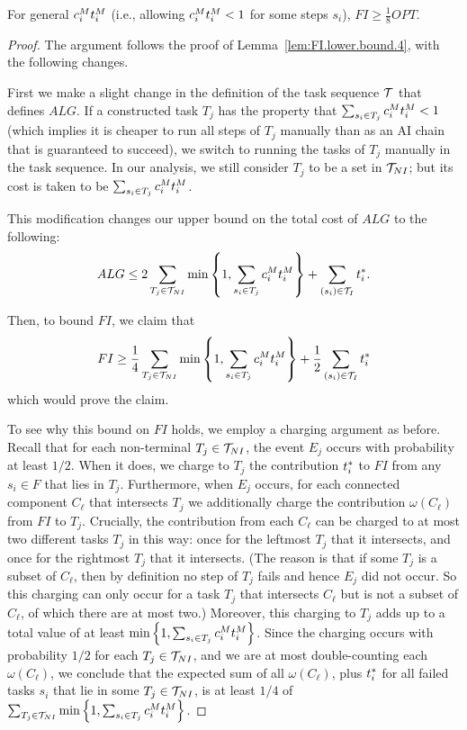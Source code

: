 \begin{lem}
\label{lem:FI.lower.bound.8}
    For general $c^{M}_{i}t^{M}_{i}$ (i.e., allowing $c^{M}_{i}t^{M}_{i} < 1$ for some steps $s_i$), $FI \geq \frac{1}{8}OPT$.
\end{lem}
\begin{proof}
    The argument follows the proof of Lemma~\ref{lem:FI.lower.bound.4}, with the following changes.

    First we make a slight change in the definition of the task sequence $\mathcal{T}$ that defines $ALG$.
    If a constructed task $T_j$ has the property that $\sum_{s_i \in T_j} c^{M}_{i}t^{M}_{i} < 1$ (which implies it is cheaper to run all steps of $T_j$ manually than as an AI chain that is guaranteed to succeed), we switch to running the tasks of $T_j$ manually in the task sequence.
    In our analysis, we still consider $T_j$ to be a set in $\mathcal{T}_{NI}$; but its cost is taken to be $\sum_{s_i \in T_j} c^{M}_{i}t^{M}_{i}$.

    This modification changes our upper bound on the total cost of $ALG$ to the following:
    \[ ALG \leq 2 \sum_{T_j \in \mathcal{T}_{NI}} \min\left\{1, \sum_{s_i \in T_j} c^{M}_{i}t^{M}_{i} \right\} + \sum_{ (s_i) \in \mathcal{T}_I} t^*_{i}. \]

    Then, to bound $FI$, we claim that
    \[ FI \geq \frac{1}{4}\sum_{T_j \in \mathcal{T}_{NI}} \min\left\{1, \sum_{s_i \in T_j} c^{M}_{i}t^{M}_{i} \right\} + \frac{1}{2}\sum_{(s_i) \in \mathcal{T}_I} t^*_{i} \]
    which would prove the claim.

    To see why this bound on $FI$ holds, we employ a charging argument as before.
    Recall that for each non-terminal $T_j \in \mathcal{T}_{NI}$, the event $E_j$ occurs with probability at least $1/2$.
    When it does, we charge to $T_j$ the contribution $t^*_{i}$ to $FI$ from any $s_i \in F$ that lies in $T_j$.
    Furthermore, when $E_j$ occurs, for each connected component $C_\ell$ that intersects $T_j$ we additionally charge the contribution $\omega(C_\ell)$ from $FI$ to $T_j$.
    Crucially, the contribution from each $C_\ell$ can be charged to at most two different tasks $T_j$ in this way: once for the leftmost $T_j$ that it intersects, and once for the rightmost $T_j$ that it intersects.
    (The reason is that if some $T_j$ is a subset of $C_\ell$, then by definition no step of $T_j$ fails and hence $E_j$ did not occur.
    So this charging can only occur for a task $T_j$ that intersects $C_\ell$ but is not a subset of $C_\ell$, of which there are at most two.)
    Moreover, this charging to $T_j$ adds up to a  total value of at least $\min\left\{1, \sum_{s_i \in T_j} c^{M}_{i}t^{M}_{i} \right\}$.
    Since the charging occurs with probability $1/2$ for each $T_j \in \mathcal{T}_{NI}$, and we are at most double-counting each $\omega(C_\ell)$, we conclude that the expected sum of all $\omega(C_\ell)$, plus $t^*_{i}$ for all failed tasks $s_i$ that lie in some $T_j \in \mathcal{T}_{NI}$, is at least $1/4$ of $\sum_{T_j \in \mathcal{T}_{NI}}\min\left\{1, \sum_{s_i \in T_j} c^{M}_{i}t^{M}_{i} \right\}$.


\end{proof}
